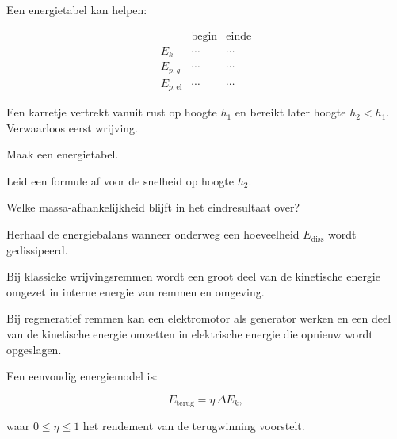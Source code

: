 \documentclass{ximera}
\begin{document}
Een energietabel kan helpen:

\[
\begin{array}{c|c|c}
&\text{begin}&\text{einde}\\ \hline
E_k&\cdots&\cdots\\
E_{p,g}&\cdots&\cdots\\
E_{p,\mathrm{el}}&\cdots&\cdots
\end{array}
\]


\begin{oefening}{\oefU\ESS}

Een karretje vertrekt vanuit rust op hoogte $h_1$ en bereikt later hoogte
$h_2<h_1$. Verwaarloos eerst wrijving.

\begin{question}
Maak een energietabel.
\end{question}

\begin{question}
Leid een formule af voor de snelheid op hoogte $h_2$.
\end{question}

\begin{question}
Welke massa-afhankelijkheid blijft in het eindresultaat over?
\end{question}

\begin{question}
Herhaal de energiebalans wanneer onderweg een hoeveelheid
$E_{\mathrm{diss}}$ wordt gedissipeerd.
\end{question}

\end{oefening}



Bij klassieke wrijvingsremmen wordt een groot deel van de kinetische energie
omgezet in interne energie van remmen en omgeving.

Bij regeneratief remmen kan een elektromotor als generator werken en een deel
van de kinetische energie omzetten in elektrische energie die opnieuw wordt
opgeslagen.

Een eenvoudig energiemodel is:

\[
E_{\mathrm{terug}}=\eta\,\Delta E_k,
\]

waar $0\leq\eta\leq1$ het rendement van de terugwinning voorstelt.
\end{document}
